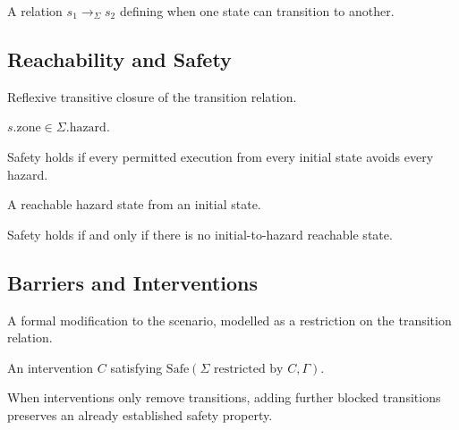 \begin{definition}
A relation $s_1 \to_\Sigma s_2$ defining when one state can transition to another.
\end{definition}

\subsection{Reachability and Safety}

\begin{definition}[Reachability]
Reflexive transitive closure of the transition relation.
\end{definition}

\begin{definition}
$s.\text{zone} \in \Sigma.\text{hazard}$.
\end{definition}

\begin{definition}
Safety holds if every permitted execution from every initial state avoids every hazard.
\end{definition}

\begin{definition}
A reachable hazard state from an initial state.
\end{definition}

\begin{theorem}
Safety holds if and only if there is no initial-to-hazard reachable state.
\end{theorem}

\subsection{Barriers and Interventions}

\begin{definition}[Intervention]
A formal modification to the scenario, modelled as a restriction on the transition relation.
\end{definition}

\begin{definition}
An intervention $C$ satisfying $\text{Safe}(\Sigma \text{ restricted by } C, \Gamma)$.
\end{definition}

\begin{theorem}
When interventions only remove transitions, adding further blocked transitions preserves an already established safety property.
\end{theorem}


